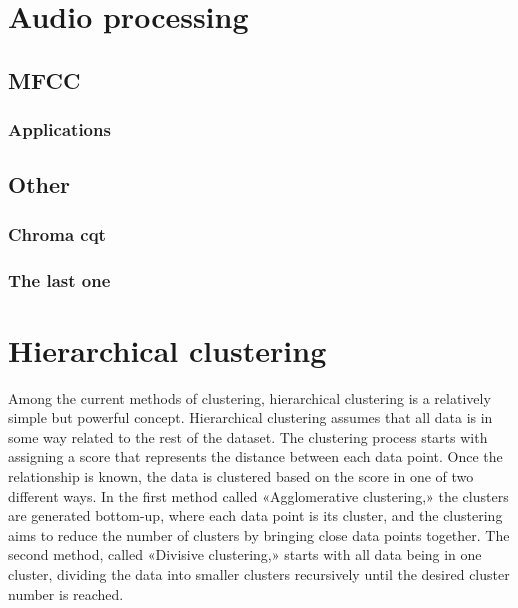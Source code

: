 \section{Audio processing}

\subsection{MFCC}


\subsubsection{Applications}

\subsection{Other}
\subsubsection{Chroma cqt}
\subsubsection{The last one}




\section{Hierarchical clustering}



Among the current methods of clustering, hierarchical clustering is a relatively simple but powerful concept. Hierarchical clustering assumes that all data is in some way related to the rest of the dataset. The clustering process starts with assigning a score that represents the distance between each data point. Once the relationship is known, the data is clustered based on the score in one of two different ways. In the first method called «Agglomerative clustering,» the clusters are generated bottom-up, where each data point is its cluster, and the clustering aims to reduce the number of clusters by bringing close data points together. The second method, called «Divisive clustering,» starts with all data being in one cluster, dividing the data into smaller clusters recursively until the desired cluster number is reached.

